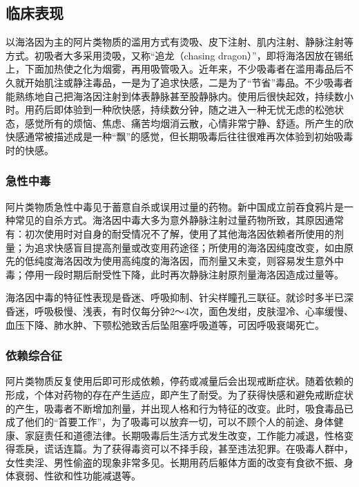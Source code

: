 \subsection{临床表现}

以海洛因为主的阿片类物质的滥用方式有烫吸、皮下注射、肌内注射、静脉注射等方式。初吸者大多采用烫吸，又称``追龙（chasing
dragon）''，即将海洛因放在锡纸上，下面加热使之化为烟雾，再用吸管吸入。近年来，不少吸毒者在滥用毒品后不久就开始肌注或静注毒品，一是为了追求快感，二是为了``节省''毒品。不少吸毒者能熟练地自己把海洛因注射到体表静脉甚至股静脉内。使用后很快起效，持续数小时。用药后即体验到一种欣快感，持续数分钟，随之进入一种无忧无虑的松弛状态，感觉所有的烦恼、焦虑、痛苦均烟消云散，心情非常宁静、舒适。所产生的欣快感通常被描述成是一种``飘''的感觉，但长期吸毒后往往很难再次体验到初始吸毒时的快感。

\subsubsection{急性中毒}

阿片类物质急性中毒见于蓄意自杀或误用过量的药物。新中国成立前吞食鸦片是一种常见的自杀方式。海洛因中毒大多为意外静脉注射过量药物所致，其原因通常有：初次使用时对自身的耐受情况不了解，使用了其他海洛因依赖者所使用的剂量；为追求快感盲目提高剂量或改变用药途径；所使用的海洛因纯度改变，如由原先的低纯度海洛因改为使用高纯度的海洛因，而剂量又未变，则容易发生意外中毒；停用一段时期后耐受性下降，此时再次静脉注射原剂量海洛因造成过量等。

海洛因中毒的特征性表现是昏迷、呼吸抑制、针尖样瞳孔三联征。就诊时多半已深昏迷，呼吸极慢、浅表，有时仅每分钟2～4次，面色发绀，皮肤湿冷、心率缓慢、血压下降、肺水肿、下颚松弛致舌后坠阻塞呼吸道等，可因呼吸衰竭死亡。

\subsubsection{依赖综合征}

阿片类物质反复使用后即可形成依赖，停药或减量后会出现戒断症状。随着依赖的形成，个体对药物的存在产生适应，即产生了耐受。为了获得快感和避免戒断症状的产生，吸毒者不断增加剂量，并出现人格和行为特征的改变。此时，吸食毒品已成了他们的``首要工作''，为了吸毒可以放弃一切，可以不顾个人的前途、身体健康、家庭责任和道德法律。长期吸毒后生活方式发生改变，工作能力减退，性格变得乖戾，谎话连篇。为了获得毒资可以不择手段，甚至违法犯罪。在吸毒人群中，女性卖淫、男性偷盗的现象非常多见。长期用药后躯体方面的改变有食欲不振、身体衰弱、性欲和性功能减退等。

